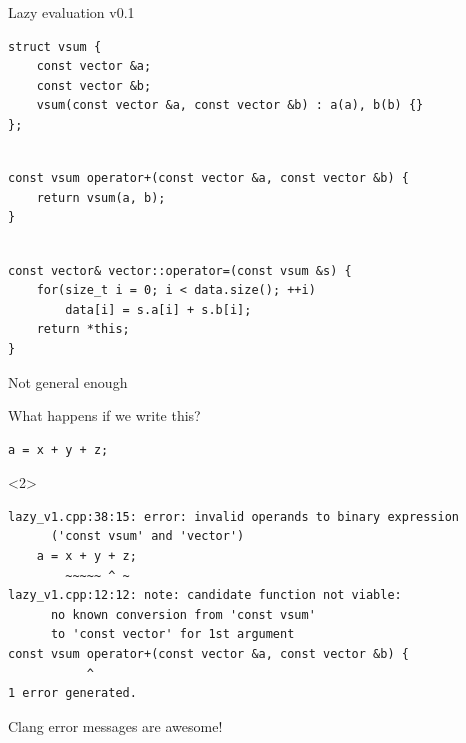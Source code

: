 \documentclass[@BEAMER_OPTIONS@]{beamer}
\begin{document}
\begin{frame}[fragile]{Lazy evaluation v0.1}
    \begin{exampleblock}{}
        \begin{lstlisting}
struct vsum {
    const vector &a;
    const vector &b;
    vsum(const vector &a, const vector &b) : a(a), b(b) {}
};
        \end{lstlisting}
        \pause
        \begin{lstlisting}[firstnumber=last]

const vsum operator+(const vector &a, const vector &b) {
    return vsum(a, b);
}
        \end{lstlisting}
        \pause
        \begin{lstlisting}[firstnumber=last]

const vector& vector::operator=(const vsum &s) {
    for(size_t i = 0; i < data.size(); ++i)
        data[i] = s.a[i] + s.b[i];
    return *this;
}
        \end{lstlisting}
    \end{exampleblock}
\end{frame}

\note{ }

\begin{frame}[fragile]{Not general enough}
    \begin{exampleblock}{What happens if we write this?}
        \begin{lstlisting}
a = x + y + z;
        \end{lstlisting}
    \end{exampleblock}

    \begin{exampleblock}<2>{}
        \begin{verbatim}
lazy_v1.cpp:38:15: error: invalid operands to binary expression
      ('const vsum' and 'vector')
    a = x + y + z;
        ~~~~~ ^ ~
lazy_v1.cpp:12:12: note: candidate function not viable:
      no known conversion from 'const vsum'
      to 'const vector' for 1st argument
const vsum operator+(const vector &a, const vector &b) {
           ^
1 error generated.
        \end{verbatim}
    \end{exampleblock}
    \begin{description}
        \item<2>[Sidenote:] Clang error messages are awesome!
    \end{description}
\end{frame}
\end{document}
